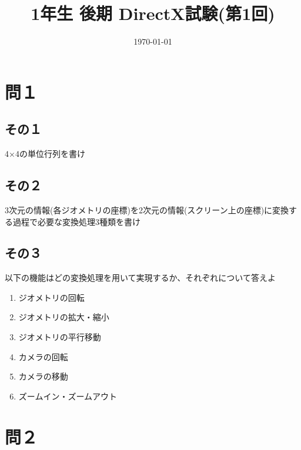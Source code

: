 \documentclass[11pt]{article}
\date{\today}
\title{1年生 後期 DirectX試験(第1回)}
\begin{document}
\maketitle

\section*{問１}
\label{sec:org56aeac4}
\subsection*{その１}
\label{sec:orgb7bb1db}
4×4の単位行列を書け\\

\subsection*{その２}
\label{sec:org0dd9955}
3次元の情報(各ジオメトリの座標)を2次元の情報(スクリーン上の座標)に変換する過程で必要な変換処理3種類を書け\\

\subsection*{その３}
\label{sec:orge1ec434}
以下の機能はどの変換処理を用いて実現するか、それぞれについて答えよ\\
\begin{enumerate}
\item ジオメトリの回転\\
\item ジオメトリの拡大・縮小\\
\item ジオメトリの平行移動\\
\item カメラの回転\\
\item カメラの移動\\
\item ズームイン・ズームアウト\\
\end{enumerate}


\section*{問２}
\label{sec:org7cdda78}
\end{document}
